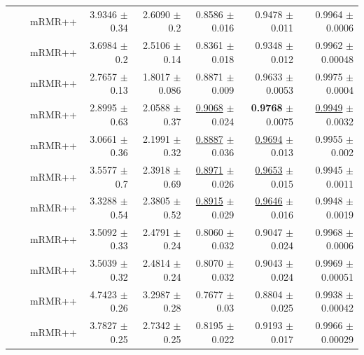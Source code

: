 \begin{longtable}{llp{}rrrrr}
 &  & mRMR++ & 3.9346 {\scriptsize $\pm$ 0.34} & 2.6090 {\scriptsize $\pm$ 0.2} & 0.8586 {\scriptsize $\pm$ 0.016} & 0.9478 {\scriptsize $\pm$ 0.011} & 0.9964 {\scriptsize $\pm$ 0.0006} \\
 &  & mRMR++ & 3.6984 {\scriptsize $\pm$ 0.2} & 2.5106 {\scriptsize $\pm$ 0.14} & 0.8361 {\scriptsize $\pm$ 0.018} & 0.9348 {\scriptsize $\pm$ 0.012} & 0.9962 {\scriptsize $\pm$ 0.00048} \\
 &  & mRMR++ & 2.7657 {\scriptsize $\pm$ 0.13} & 1.8017 {\scriptsize $\pm$ 0.086} & 0.8871 {\scriptsize $\pm$ 0.009} & 0.9633 {\scriptsize $\pm$ 0.0053} & 0.9975 {\scriptsize $\pm$ 0.0004} \\
 &  & mRMR++ & 2.8995 {\scriptsize $\pm$ 0.63} & 2.0588 {\scriptsize $\pm$ 0.37} & \underline{0.9068} {\scriptsize $\pm$ 0.024} & \textbf{0.9768} {\scriptsize $\pm$ 0.0075} & \underline{0.9949} {\scriptsize $\pm$ 0.0032} \\
 &  & mRMR++ & 3.0661 {\scriptsize $\pm$ 0.36} & 2.1991 {\scriptsize $\pm$ 0.32} & \underline{0.8887} {\scriptsize $\pm$ 0.036} & \underline{0.9694} {\scriptsize $\pm$ 0.013} & 0.9955 {\scriptsize $\pm$ 0.002} \\
 &  & mRMR++ & 3.5577 {\scriptsize $\pm$ 0.7} & 2.3918 {\scriptsize $\pm$ 0.69} & \underline{0.8971} {\scriptsize $\pm$ 0.026} & \underline{0.9653} {\scriptsize $\pm$ 0.015} & 0.9945 {\scriptsize $\pm$ 0.0011} \\
 &  & mRMR++ & 3.3288 {\scriptsize $\pm$ 0.54} & 2.3805 {\scriptsize $\pm$ 0.52} & \underline{0.8915} {\scriptsize $\pm$ 0.029} & \underline{0.9646} {\scriptsize $\pm$ 0.016} & 0.9948 {\scriptsize $\pm$ 0.0019} \\
 &  & mRMR++ & 3.5092 {\scriptsize $\pm$ 0.33} & 2.4791 {\scriptsize $\pm$ 0.24} & 0.8060 {\scriptsize $\pm$ 0.032} & 0.9047 {\scriptsize $\pm$ 0.024} & 0.9968 {\scriptsize $\pm$ 0.0006} \\
 &  & mRMR++ & 3.5039 {\scriptsize $\pm$ 0.32} & 2.4814 {\scriptsize $\pm$ 0.24} & 0.8070 {\scriptsize $\pm$ 0.032} & 0.9043 {\scriptsize $\pm$ 0.024} & 0.9969 {\scriptsize $\pm$ 0.00051} \\
 &  & mRMR++ & 4.7423 {\scriptsize $\pm$ 0.26} & 3.2987 {\scriptsize $\pm$ 0.28} & 0.7677 {\scriptsize $\pm$ 0.03} & 0.8804 {\scriptsize $\pm$ 0.025} & 0.9938 {\scriptsize $\pm$ 0.00042} \\
 &  & mRMR++ & 3.7827 {\scriptsize $\pm$ 0.25} & 2.7342 {\scriptsize $\pm$ 0.25} & 0.8195 {\scriptsize $\pm$ 0.022} & 0.9193 {\scriptsize $\pm$ 0.017} & 0.9966 {\scriptsize $\pm$ 0.00029} \\

\end{longtable}
